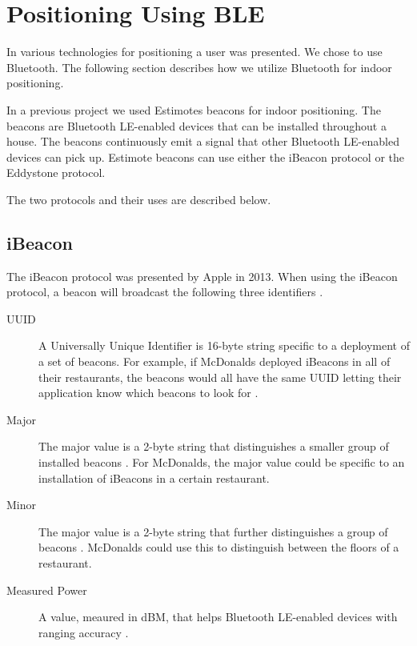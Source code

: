 \section{Positioning Using BLE}
\label{sec:design:ble-positioning}

In  various technologies for positioning a user was presented. We chose to use Bluetooth. The following section describes how we utilize Bluetooth for indoor positioning.

In a previous project \cite{prespecialisation} we used Estimotes beacons for indoor positioning. The beacons are Bluetooth LE-enabled devices that can be installed throughout a house. The beacons continuously emit a signal that other Bluetooth LE-enabled devices can pick up.
Estimote beacons can use either the iBeacon protocol or the Eddystone protocol.

The two protocols and their uses are described below.

\subsection{iBeacon}

The iBeacon protocol was presented by Apple in 2013. When using the iBeacon protocol, a beacon will broadcast the following three identifiers \cite[ch. 1]{gilchrist2014learning}.

\begin{description}
\item[UUID] A Universally Unique Identifier is 16-byte string \cite{estimote:what-is-ibeacon} specific to a deployment of a set of beacons. For example, if McDonalds deployed iBeacons in all of their restaurants, the beacons would all have the same UUID letting their application know which beacons to look for \cite[ch. 1]{gilchrist2014learning}.
\item[Major] The major value is a 2-byte string \cite{estimote:what-is-ibeacon} that distinguishes a smaller group of installed beacons \cite[ch. 1]{gilchrist2014learning}. For McDonalds, the major value could be specific to an installation of iBeacons in a certain restaurant.
\item[Minor] The major value is a 2-byte string \cite{estimote:what-is-ibeacon} that further distinguishes a group of beacons \cite[ch. 1]{gilchrist2014learning}. McDonalds could use this to distinguish between the floors of a restaurant.
\item[Measured Power] A value, meaured in dBM, that helps Bluetooth LE-enabled devices with ranging accuracy \cite{apple:proximity-beacon-spec}.
\end{description}

